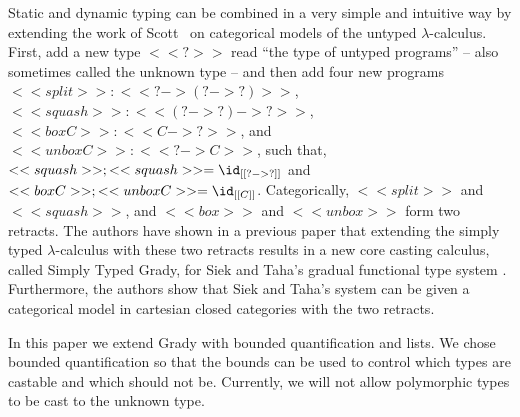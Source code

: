 Static and dynamic typing can be combined in a very simple and
intuitive way by extending the work of Scott~\cite{Scott:1980} on
categorical models of the untyped $\lambda$-calculus.  First, add a
new type $<<?>>$ read ``the type of untyped programs'' -- also
sometimes called the unknown type -- and then add four new programs
$<<split>> : <<? -> (? -> ?)>>$, $ <<squash>> : <<(? -> ?) -> ?>> $,
$<<box C>> : <<C -> ?>>$, and $<<unbox C>> : <<? -> C>>$, such that,
$<<squash>>;<<squash>> = \id_{[[? -> ?]]}$ and $<<box C>>;<<unbox C>>
= \id_{[[C]]}$.  Categorically, $<<split>>$ and $<<squash>>$, and
$<<box>>$ and $<<unbox>>$ form two retracts.  The authors
\cite{Eades:2017} have shown in a previous paper that extending the
simply typed $\lambda$-calculus with these two retracts results in a
new core casting calculus, called Simply Typed Grady, for Siek and
Taha's gradual functional type system \cite{Siek:2015}.  Furthermore,
the authors show that Siek and Taha's system can be given a
categorical model in cartesian closed categories with the two
retracts.

In this paper we extend Grady with bounded quantification and lists.
We chose bounded quantification so that the bounds can be used to
control which types are castable and which should not be.  Currently,
we will not allow polymorphic types to be cast to the unknown type.  

